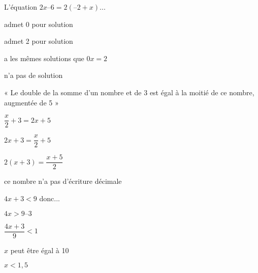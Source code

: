 

\begin{QCM}
  \begin{GroupeQCM} 
  
    \begin{exercice}
      L'équation $2x – 6 = 2(– 2 + x)$...
      \begin{ChoixQCM}{4}
      \item admet 0 pour solution
      \item admet 2 pour solution
      \item a les mêmes solutions que $0x = 2$
      \item n'a pas de solution
      \end{ChoixQCM}
\begin{corrige}
   \end{corrige}
    \end{exercice}
    
      \begin{exercice}
      « Le double de la somme d'un nombre et de 3 est égal à la moitié de ce nombre, augmentée de 5 »
      \begin{ChoixQCM}{4}
      \item $\dfrac{x}{2} + 3 = 2x + 5$
      \item $2x + 3 = \dfrac{x}{2} + 5$
      \item $2(x + 3) = \dfrac{x+5}{2}$
      \item ce nombre n'a pas d'écriture décimale
      \end{ChoixQCM}
\begin{corrige}
   \end{corrige}
    \end{exercice}
    
      \begin{exercice}
     $4x + 3 < 9$ donc...
   \begin{ChoixQCM}{4}
      \item $4x > 9 – 3$
      \item $\dfrac{4x+3}{9}< 1$
      \item $x$ peut être égal à 10
      \item $x < 1,5$
      \end{ChoixQCM}
\begin{corrige}
   \end{corrige}
    \end{exercice}
    

\end{GroupeQCM}
\end{QCM}
